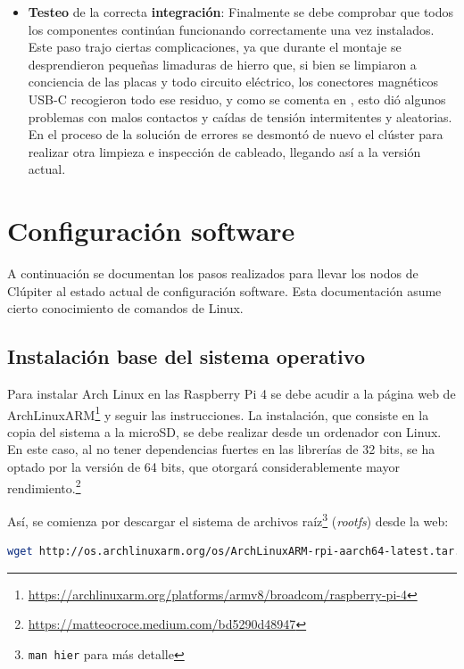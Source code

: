 \begin{itemize}
    \item \textbf{Testeo} de la correcta \textbf{integración}: Finalmente se debe comprobar que todos los componentes continúan funcionando correctamente una vez instalados. Este paso trajo ciertas complicaciones, ya que durante el montaje se desprendieron pequeñas limaduras de hierro que, si bien se limpiaron a conciencia de las placas y todo circuito eléctrico, los conectores magnéticos USB-C recogieron todo ese residuo, y como se comenta en , esto dió algunos problemas con malos contactos y caídas de tensión intermitentes y aleatorias. En el proceso de la solución de errores se desmontó de nuevo el clúster para realizar otra limpieza e inspección de cableado, llegando así a la versión actual.
\end{itemize}

\section{Configuración software}
\label{sec:configuracion_software}
A continuación se documentan los pasos realizados para llevar los nodos de Clúpiter al estado actual de configuración software. Esta documentación asume cierto conocimiento de comandos de Linux.

\subsection{Instalación base del sistema operativo}
\label{ssec:instalacion_sistema_operativo}
Para instalar Arch Linux en las Raspberry Pi 4 se debe acudir a la página web de ArchLinuxARM\footnote{\url{https://archlinuxarm.org/platforms/armv8/broadcom/raspberry-pi-4}} y seguir las instrucciones. La instalación, que consiste en la copia del sistema a la microSD, se debe realizar desde un ordenador con Linux. En este caso, al no tener dependencias fuertes en las librerías de 32 bits, se ha optado por la versión de 64 bits, que otorgará considerablemente mayor rendimiento.\footnote{\url{https://matteocroce.medium.com/bd5290d48947}}

Así, se comienza por descargar el sistema de archivos raíz\footnote{\texttt{man hier} para más detalle} (\textit{\gls{rootfs}}) desde la web:

\begin{lstlisting}[language=bash]
wget http://os.archlinuxarm.org/os/ArchLinuxARM-rpi-aarch64-latest.tar.gz
\end{lstlisting}

